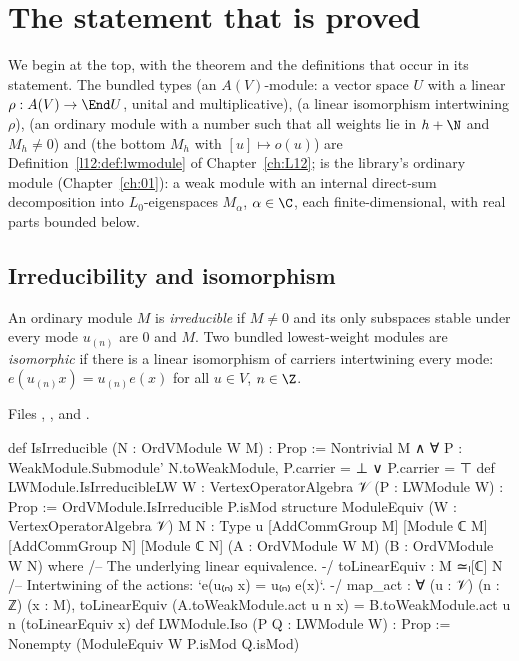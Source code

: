 \section{The statement that is proved}\label{l13:sec:statement}

We begin at the top, with the theorem and the definitions that occur in its statement. The bundled types
 (an $A(V)$-module: a vector space $U$ with a linear $\rho:A(V)\to\End U$, unital and multiplicative),
 (a linear isomorphism intertwining $\rho$),  (an ordinary module
 with a number  such that all weights lie in $h+\N$ and $M_h\neq0$) and
 (the bottom $M_h$ with $[u]\mapsto o(u)$) are Definition~\ref{l12:def:lwmodule} of
Chapter~\ref{ch:L12};  is the library's ordinary module (Chapter~\ref{ch:01}): a weak module with an
internal direct-sum decomposition into $L_0$-eigenspaces $M_\alpha$, $\alpha\in\C$, each finite-dimensional, with real
parts bounded below.

\subsection{Irreducibility and isomorphism}

\begin{definition}\label{l13:def:irr}
An ordinary module $M$ is \emph{irreducible} if $M\neq0$ and its only subspaces stable under every mode $u_{(n)}$ are $0$
and $M$. Two bundled lowest-weight modules are \emph{isomorphic} if there is a linear isomorphism of carriers
intertwining every mode: $e(u_{(n)}x) = u_{(n)}e(x)$ for all $u\in V$, $n\in\Z$.
\end{definition}
\noindent Files ,
,
 and
.
\begin{leancode}
def IsIrreducible (N : OrdVModule W M) : Prop :=
  Nontrivial M ∧ ∀ P : WeakModule.Submodule' N.toWeakModule, P.carrier = ⊥ ∨ P.carrier = ⊤
def LWModule.IsIrreducibleLW {W : VertexOperatorAlgebra 𝒱} (P : LWModule W) : Prop :=
  OrdVModule.IsIrreducible P.isMod
structure ModuleEquiv (W : VertexOperatorAlgebra 𝒱) {M N : Type u} [AddCommGroup M]
    [Module ℂ M] [AddCommGroup N] [Module ℂ N] (A : OrdVModule W M) (B : OrdVModule W N) where
  /-- The underlying linear equivalence. -/
  toLinearEquiv : M ≃ₗ[ℂ] N
  /-- Intertwining of the actions: `e(u₍ₙ₎ x) = u₍ₙ₎ e(x)`. -/
  map_act : ∀ (u : 𝒱) (n : ℤ) (x : M),
    toLinearEquiv (A.toWeakModule.act u n x) = B.toWeakModule.act u n (toLinearEquiv x)
def LWModule.Iso (P Q : LWModule W) : Prop :=
  Nonempty (ModuleEquiv W P.isMod Q.isMod)
\end{leancode}

